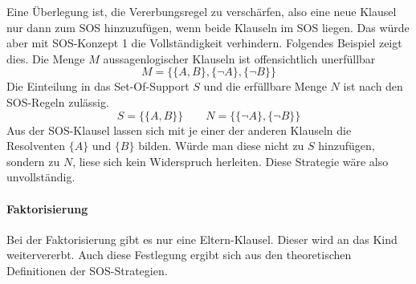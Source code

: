 Eine Überlegung ist, die Vererbungsregel zu verschärfen, also eine neue Klausel nur dann zum SOS hinzuzufügen, wenn beide Klauseln im SOS liegen. Das würde aber mit SOS-Konzept 1 die Vollständigkeit verhindern. Folgendes Beispiel zeigt dies. Die Menge $M$ aussagenlogischer Klauseln ist offensichtlich unerfüllbar
$$M=\big\{\{A,B\},\{\neg A\},\{\neg B\}\big\}$$
Die Einteilung in das Set-Of-Support $S$ und die erfüllbare Menge $N$ ist nach den SOS-Regeln zulässig.
$$S=\big\{\{A,B\}\big\} \quad\quad N=\big\{\{\neg A\},\{\neg B\}\big\}$$
Aus der SOS-Klausel lassen sich mit je einer der anderen Klauseln die Resolventen $\{A\}$ und $\{B\}$ bilden. Würde man diese nicht zu $S$ hinzufügen, sondern zu $N$, liese sich kein Widerspruch herleiten. Diese Strategie wäre also unvollständig.
\paragraph{Faktorisierung}
Bei der Faktorisierung gibt es nur eine Eltern-Klausel. Dieser wird an das Kind weitervererbt. Auch diese Festlegung ergibt sich aus den theoretischen Definitionen der SOS-Strategien. \cite{Haifani2021Sos}